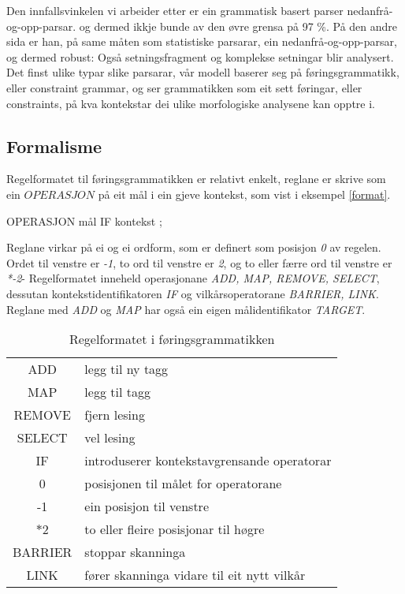 \documentclass[a4paper,nynorsk]{article}
\begin{document}
Den innfallsvinkelen vi arbeider etter er ein grammatisk basert parser nedanfrå-og-opp-parsar. og dermed ikkje bunde av den øvre grensa på 97 \%. På den andre sida er han, på same måten som statistiske parsarar, ein nedanfrå-og-opp-parsar, og dermed robust: Også setningsfragment og komplekse setningar blir analysert. Det finst ulike typar slike parsarar, vår modell baserer seg på føringsgrammatikk, eller constraint grammar, og ser grammatikken som eit sett føringar, eller constraints, på kva kontekstar dei ulike morfologiske analysene kan opptre i.%

\subsection{Formalisme}

Regelformatet til føringsgrammatikken er relativt enkelt, reglane er skrive som ein $OPERASJON$ på eit mål i ein gjeve kontekst, som vist i eksempel \ref{format}. %

\begin{example}\label{format}
OPERASJON mål IF kontekst ;
\end{example}

Reglane virkar på ei og ei ordform, som er definert som posisjon \emph{0} av regelen. Ordet til venstre er \emph{-1}, to ord til venstre er \emph{2}, og to eller færre ord til venstre er \emph{*-2}- Regelformatet inneheld operasjonane \emph{ADD, MAP, REMOVE, SELECT}, dessutan kontekstidentifikatoren \emph{IF} og vilkårsoperatorane \emph{BARRIER, LINK}. Reglane med \emph{ADD} og \emph{MAP} har også ein eigen målidentifikator \emph{TARGET}.%

\begin{table}[htdp]
\caption{Regelformatet i føringsgrammatikken}
\begin{center}
\begin{tabular}{|c|l|}
\hline
 ADD & legg til ny tagg \\
 MAP & legg til tagg \\
 REMOVE & fjern lesing \\
 SELECT & vel lesing \\
\hline 
 IF & introduserer kontekstavgrensande operatorar \\
\hline 
 0 & posisjonen til målet for operatorane \\
 -1 & ein posisjon til venstre \\
 $\ast2$ & to eller fleire posisjonar til høgre \\
\hline 
 BARRIER & stoppar skanninga \\
 LINK & fører skanninga vidare til eit nytt vilkår \\
\hline 
\end{tabular}
\end{center}
\label{default}
\end{table}%
\end{document}
